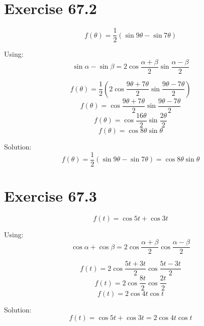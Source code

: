 \documentclass[a4paper, 10pt]{scrartcl}
\begin{document}
\section{Exercise 67.2}

\[f(\theta) = \frac{1}{2}(\sin{9\theta} - \sin{7\theta})\]

Using:
\[\sin{\alpha} - \sin{\beta} = 2\cos{\frac{\alpha + \beta}{2}}\sin{\frac{\alpha - \beta}{2}}\]

\[f(\theta) = \frac{1}{2}(2\cos{\frac{9\theta + 7\theta}{2}}\sin{\frac{9\theta - 7\theta}{2}})\]
\[f(\theta) = \cos{\frac{9\theta + 7\theta}{2}}\sin{\frac{9\theta - 7\theta}{2}}\]
\[f(\theta) = \cos{\frac{16\theta}{2}}\sin{\frac{2\theta}{2}}\]
\[f(\theta) = \cos{8\theta}\sin{\theta}\]

Solution:
\[f(\theta) = \frac{1}{2}(\sin{9\theta} - \sin{7\theta}) = \cos{8\theta}\sin{\theta}\]

\section{Exercise 67.3}

\[f(t) = \cos{5t} + \cos{3t}\]

Using:
\[\cos{\alpha} + \cos{\beta} = 2\cos{\frac{\alpha + \beta}{2}}\cos{\frac{\alpha - \beta}{2}}\]

\[f(t) = 2\cos{\frac{5t + 3t}{2}}\cos{\frac{5t - 3t}{2}}\]
\[f(t) = 2\cos{\frac{8t}{2}}\cos{\frac{2t}{2}}\]
\[f(t) = 2\cos{4t}\cos{t}\]

Solution:
\[f(t) = \cos{5t} + \cos{3t} = 2\cos{4t}\cos{t}\]
\end{document}
